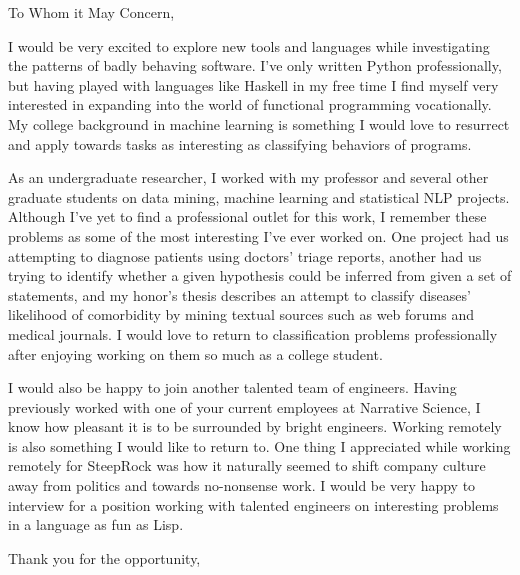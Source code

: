 \documentclass{letter}
\begin{document}
\signature{Walter Askew\\
1221 Washtenaw Apt 3R\\
Chicago, IL 60622}

\begin{letter}{}

\opening{To Whom it May Concern,}

I would be very excited to explore new tools and languages while
investigating the patterns of badly behaving software.
I've only written Python professionally, but having played with
languages like Haskell in my free time I find myself very interested
in expanding into the world of functional programming vocationally.
My college background in machine learning is something I would love to
resurrect and apply towards tasks as interesting as classifying
behaviors of programs.

As an undergraduate researcher, I worked with my professor and several
other graduate students on data mining, machine learning and
statistical NLP projects.
Although I've yet to find a professional outlet for this work, I
remember these problems as some of the most interesting I've ever
worked on.
One project had us attempting to diagnose patients using doctors'
triage reports, another had us trying to identify whether a
given hypothesis could be inferred from given a set of statements, and
my honor's thesis describes an attempt to classify diseases'
likelihood of comorbidity by mining textual sources such as web forums
and medical journals.
I would love to return to classification problems professionally after
enjoying working on them so much as a college student.

I would also be happy to join another talented team of engineers.
Having previously worked with one of your current employees at
Narrative Science, I know how pleasant it is to be surrounded by
bright engineers.
Working remotely is also something I would like to return to.
One thing I appreciated while working remotely for SteepRock was how
it naturally seemed to shift company culture away from politics and
towards no-nonsense work.
I would be very happy to interview for a position working with
talented engineers on interesting problems in a language as
fun as Lisp.

\closing{Thank you for the opportunity,}
\end{letter}
\end{document}
